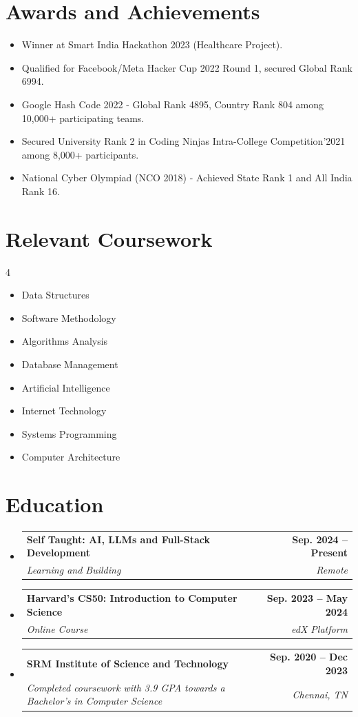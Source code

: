 \documentclass[letterpaper,11pt]{article}
\makeatletter
\newcommand{\resumeSubheading}[4]{
  \vspace{-2pt}\item
    \begin{tabular*}{1.0\textwidth}[t]{l@{\extracolsep{\fill}}r}
      \textbf{#1} & \textbf{\small #2} \\
      \textit{\small#3} & \textit{\small #4} \\
    \end{tabular*}\vspace{-7pt}
}
\newcommand{\resumeSubHeadingListStart}{\begin{itemize}[leftmargin=0.0in, label={}]}
\newcommand{\resumeSubHeadingListEnd}{\end{itemize}}
\makeatother
\begin{document}
\section{Awards and Achievements}
    \begin{itemize}[itemsep=-5pt, parsep=3pt]
        \item Winner at Smart India Hackathon 2023 (Healthcare Project).
        \item Qualified for Facebook/Meta Hacker Cup 2022 Round 1, secured Global Rank 6994.
        \item Google Hash Code 2022 - Global Rank 4895, Country Rank 804 among 10,000+ participating teams.
        \item Secured University Rank 2 in Coding Ninjas Intra-College Competition'2021 among 8,000+ participants.
        \item National Cyber Olympiad (NCO 2018) - Achieved State Rank 1 and All India Rank 16.
    \end{itemize}
\vspace*{2.0\multicolsep}

\section{Relevant Coursework}
        \begin{multicols}{4}
            \begin{itemize}[itemsep=-5pt, parsep=3pt]
                \item Data Structures
                \item Software Methodology
                \item Algorithms Analysis
                \item Database Management
                \item Artificial Intelligence
                \item Internet Technology
                \item Systems Programming
                \item Computer Architecture
            \end{itemize}
        \end{multicols}
        \vspace*{2.0\multicolsep}

\section{Education}
\resumeSubHeadingListStart
  \resumeSubheading
    {Self Taught: AI, LLMs and Full-Stack Development}{Sep. 2024 -- Present}
    {Learning and Building}{Remote}
  \resumeSubheading
    {Harvard's CS50: Introduction to Computer Science}{Sep. 2023 -- May 2024}
    {Online Course}{edX Platform}
  \resumeSubheading
    {SRM Institute of Science and Technology}{Sep. 2020 -- Dec 2023}
    {Completed coursework with 3.9 GPA towards a Bachelor's in Computer Science}{Chennai, TN}
\resumeSubHeadingListEnd
\end{document}
